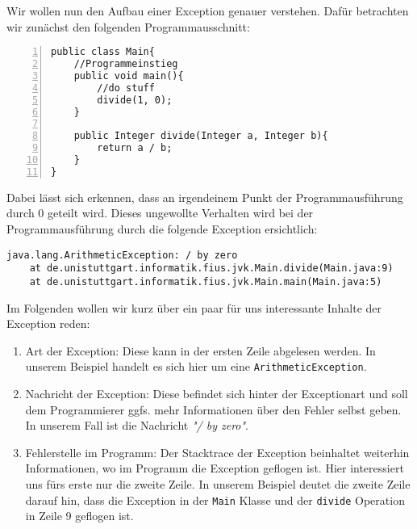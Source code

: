 \begin{Infobox}
    Wir wollen nun den Aufbau einer Exception genauer verstehen. 
    Dafür betrachten wir zunächst den folgenden Programmausschnitt:

    \begin{lstlisting}[numbers=left,xleftmargin=2em,frame=single,framexleftmargin=1.5em]
public class Main{
    //Programmeinstieg
    public void main(){
        //do stuff
        divide(1, 0);
    }
    
    public Integer divide(Integer a, Integer b){
        return a / b;
    }
}
    \end{lstlisting}

    Dabei lässt sich erkennen, dass an irgendeinem Punkt der Programmausführung durch 0 geteilt wird.
    Dieses ungewollte Verhalten wird bei der Programmausführung durch die folgende Exception ersichtlich:

    \begin{lstlisting}[keywords={}, breaklines=true, numbers=none]
java.lang.ArithmeticException: / by zero
    at de.unistuttgart.informatik.fius.jvk.Main.divide(Main.java:9)
    at de.unistuttgart.informatik.fius.jvk.Main.main(Main.java:5)
    \end{lstlisting}    

    Im Folgenden wollen wir kurz über ein paar für uns interessante Inhalte der Exception reden:

    \begin{enumerate}[label=\roman*)]
        \item Art der Exception: Diese kann in der ersten Zeile abgelesen werden. In unserem Beispiel handelt es sich hier um eine \lstinline{ArithmeticException}.
        \item Nachricht der Exception: Diese befindet sich hinter der Exceptionart und soll dem Programmierer ggfs. mehr Informationen über den Fehler selbst geben.
        In unserem Fall ist die Nachricht \textit{"/ by zero"}.
        \item Fehlerstelle im Programm: Der Stacktrace der Exception beinhaltet weiterhin Informationen, wo im Programm die Exception geflogen ist. Hier interessiert uns 
        fürs erste nur die zweite Zeile. In unserem Beispiel deutet die zweite Zeile darauf hin, dass die Exception in der \lstinline{Main} Klasse und der \lstinline{divide}
        Operation in Zeile 9 geflogen ist.
    \end{enumerate}

\end{Infobox}


